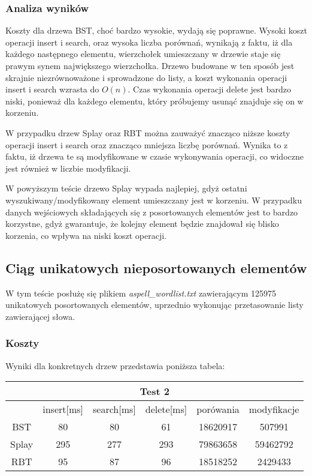 \documentclass[titlepage]{article}
\begin{document}
\subsubsection{Analiza wyników}
Koszty dla drzewa BST, choć bardzo wysokie, wydają się poprawne. Wysoki koszt operacji insert i search, oraz wysoka liczba porównań, wynikają z faktu, iż dla każdego następnego elementu, wierzchołek umieszczany w drzewie staje się prawym synem największego wierzchołka. Drzewo budowane w ten sposób jest skrajnie niezrównoważone i sprowadzone do listy, a koszt wykonania operacji insert i search wzrasta do $O(n)$. Czas wykonania operacji delete jest bardzo niski, ponieważ dla każdego elementu, który próbujemy usunąć znajduje się on w korzeniu.

W przypadku drzew Splay oraz RBT można zauważyć znacząco niższe koszty operacji insert i search oraz znacząco mniejsza liczbę porównań. Wynika to z faktu, iż drzewa te są modyfikowane w czasie wykonywania operacji, co widoczne jest również w liczbie modyfikacji. 

W powyższym teście drzewo Splay wypada najlepiej, gdyż ostatni wyszukiwany/modyfikowany element umieszczany jest w korzeniu. W przypadku danych wejściowych składających się z posortowanych elementów jest to bardzo korzystne, gdyż gwarantuje, że kolejny element będzie znajdował się blisko korzenia, co wpływa na niski koszt operacji.

\subsection{Ciąg unikatowych nieposortowanych elementów}
W tym teście posłużę się plikiem \textit{aspell\_wordlist.txt} zawierającym 125975 unikatowych posortowanych elementów, uprzednio wykonując przetasowanie listy zawierającej słowa.

\subsubsection{Koszty}
Wyniki dla konkretnych drzew przedstawia poniższa tabela: 
\begin{table}[h!]
	\centering
    \label{tab:table2}
    \begin{tabular}{|c|c|c|c|c|c|}
    		\multicolumn{6}{c}{Test 2}\\
    		\hline
      	& insert[ms] & search[ms] & delete[ms] & porówania & modyfikacje\\
      	\hline
      	BST & 80 & 80 & 61 & 18620917 & 507991\\
      	\hline
      	Splay & 295 & 277 & 293 & 79863658 & 59462792\\
      	\hline
      	RBT & 95 & 87 & 96 & 18518252 & 2429433\\
		\hline
    \end{tabular}
\end{table}
\end{document}
